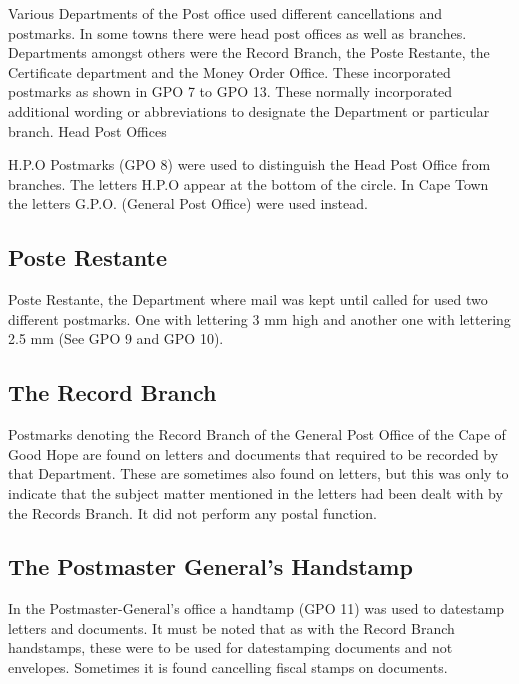 Various Departments of the Post office used different 
cancellations and postmarks. In some towns there were head 
post offices as well as branches. Departments amongst others 
were the Record Branch, the Poste Restante, the Certificate 
department and the Money Order Office. These incorporated 
postmarks as shown in GPO 7 to GPO 13. These normally 
incorporated additional wording or abbreviations to designate 
the Department or particular branch.
Head Post Offices
 

 

H.P.O Postmarks (GPO 8) were used to distinguish the Head Post Office 
from branches. The letters H.P.O appear at the bottom of the circle. 
In Cape Town the letters G.P.O. (General Post Office) were used instead.

\subsection{Poste Restante}



Poste Restante, the Department where mail was kept until 
called for used two different postmarks. One with lettering 
3 mm high and another one with lettering 2.5 mm (See GPO 9 and GPO 10).

\subsection{The Record Branch}

Postmarks denoting the Record Branch of the General Post 
Office of the Cape of Good Hope are found on letters and 
documents that required to be recorded by that Department. 
These are sometimes also found on letters, but this was 
only to indicate that the subject matter mentioned in the 
letters had been dealt with by the Records Branch. It did 
not perform any postal function.
 
\subsection{The Postmaster General's Handstamp}


In the Postmaster-General's office a handtamp (GPO 11) was used to 
datestamp letters and documents. It must be noted that as with the 
Record Branch handstamps, these were to be used for datestamping 
documents and not envelopes. Sometimes it is found cancelling fiscal 
stamps on documents.

 

 

 

 

 
 
                     